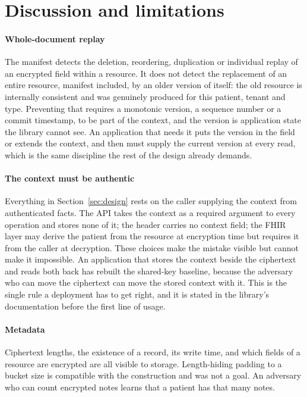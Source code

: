 \section{Discussion and limitations}
\label{sec:discussion}

\paragraph{Whole-document replay}
The manifest detects the deletion, reordering, duplication or individual replay of an encrypted field within a resource. It does not detect the replacement of an entire resource, manifest included, by an older version of itself: the old resource is internally consistent and was genuinely produced for this patient, tenant and type. Preventing that requires a monotonic version, a sequence number or a commit timestamp, to be part of the context, and the version is application state the library cannot see. An application that needs it puts the version in the  field or extends the context, and then must supply the current version at every read, which is the same discipline the rest of the design already demands.

\paragraph{The context must be authentic}
Everything in Section~\ref{sec:design} rests on the caller supplying the context from authenticated facts. The API takes the context as a required argument to every operation and stores none of it; the header carries no context field; the FHIR layer may derive the patient from the resource at encryption time but requires it from the caller at decryption. These choices make the mistake visible but cannot make it impossible. An application that stores the context beside the ciphertext and reads both back has rebuilt the shared-key baseline, because the adversary who can move the ciphertext can move the stored context with it. This is the single rule a deployment has to get right, and it is stated in the library's documentation before the first line of usage.

\paragraph{Metadata}
Ciphertext lengths, the existence of a record, its write time, and which fields of a resource are encrypted are all visible to storage. Length-hiding padding to a bucket size is compatible with the construction and was not a goal. An adversary who can count encrypted notes learns that a patient has that many notes.

